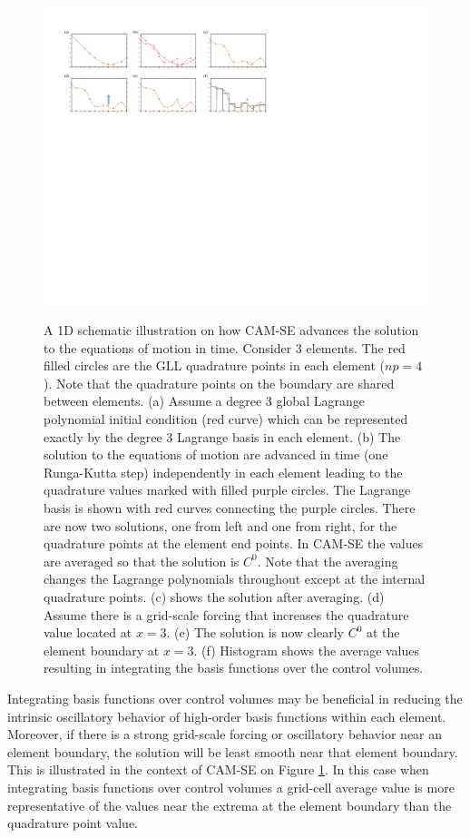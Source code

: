 \documentclass[twocol]{ametsoc}
\begin{document}
\begin{figure}[t]
\noindent\includegraphics[width=38pc,angle=0]{figs/se-schematic.pdf}\\
\caption{A 1D schematic illustration on how CAM-SE advances the solution to the equations of motion in time. Consider 3 elements. The red filled circles are the GLL quadrature points in each element ($np=4$). Note that the quadrature points on the boundary are shared between elements. (a) Assume a degree 3 global Lagrange polynomial initial condition (red curve) which can be represented exactly by the degree 3 Lagrange basis in each element. (b) The solution to the equations of motion are advanced in time (one Runga-Kutta step) independently in each element leading to the quadrature values marked with filled purple circles. The Lagrange basis is shown with red curves connecting the purple circles. There are now two solutions, one from left and one from right, for the quadrature points at the element end points. In CAM-SE the values are averaged so that the solution is $C^0$. Note that the averaging changes the Lagrange polynomials throughout except at the internal quadrature points. (c) shows the solution after averaging. (d) Assume there is a grid-scale forcing that increases the quadrature value located at $x=3$. (e) The solution is now clearly $C^0$ at the element boundary at $x=3$. (f) Histogram shows the average values resulting in integrating the basis functions over the control volumes.}
\label{fig:se-schematic}
\end{figure}

Integrating basis functions over control volumes may be beneficial in reducing the intrinsic oscillatory behavior of high-order basis functions within each element. Moreover, if there is a strong grid-scale forcing or oscillatory behavior near an element boundary, the solution will be least smooth near that element boundary. This is illustrated in the context of CAM-SE on Figure \ref{fig:se-schematic}. In this case when integrating basis functions over control volumes a grid-cell average value is more representative of the values near the extrema at the element boundary than the quadrature point value.
\end{document}
